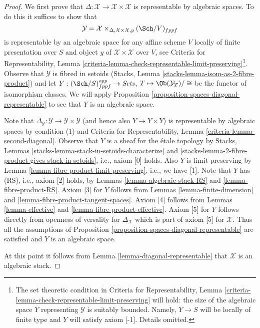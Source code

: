 \begin{proof}
We first prove that $\Delta : \mathcal{X} \to \mathcal{X} \times \mathcal{X}$
is representable by algebraic spaces. To do this it suffices to show
that
$$
\mathcal{Y} =
\mathcal{X} \times_{\Delta, \mathcal{X} \times \mathcal{X}, y} (\Sch/V)_{fppf}
$$
is representable by an algebraic space for any affine scheme $V$ locally
of finite presentation over $S$ and object $y$ of
$\mathcal{X} \times \mathcal{X}$ over $V$, see
Criteria for Representability, Lemma
\ref{criteria-lemma-check-representable-limit-preserving}\footnote{The
set theoretic condition in Criteria for Representability, Lemma
\ref{criteria-lemma-check-representable-limit-preserving}
will hold: the size of the algebraic space $Y$ representing $\mathcal{Y}$ is
suitably bounded. Namely, $Y \to S$ will be locally of finite type and $Y$
will satisfy axiom [-1]. Details omitted.}.
Observe that $\mathcal{Y}$ is fibred in setoids
(Stacks, Lemma \ref{stacks-lemma-isom-as-2-fibre-product})
and let $Y : (\Sch/S)_{fppf}^{opp} \to \textit{Sets}$,
$T \mapsto \Ob(\mathcal{Y}_T)/\cong$ be the functor of isomorphism
classes. We will apply
Proposition \ref{proposition-spaces-diagonal-representable}
to see that $Y$ is an algebraic space.

\medskip\noindent
Note that
$\Delta_\mathcal{Y} : \mathcal{Y} \to \mathcal{Y} \times \mathcal{Y}$
(and hence also $Y \to Y \times Y$)
is representable by algebraic spaces by condition (1) and
Criteria for Representability, Lemma \ref{criteria-lemma-second-diagonal}.
Observe that $Y$ is a sheaf for the \'etale topology by
Stacks, Lemmas \ref{stacks-lemma-stack-in-setoids-characterize} and
\ref{stacks-lemma-2-fibre-product-gives-stack-in-setoids}, i.e.,
axiom [0] holds. Also $Y$ is limit preserving by
Lemma \ref{lemma-fibre-product-limit-preserving}, i.e., we have [1].
Note that $Y$ has (RS), i.e., axiom [2] holds, by
Lemmas \ref{lemma-algebraic-stack-RS} and
\ref{lemma-fibre-product-RS}. Axiom [3] for $Y$ follows
from Lemmas \ref{lemma-finite-dimension} and
\ref{lemma-fibre-product-tangent-spaces}.
Axiom [4] follows from Lemmas \ref{lemma-effective} and
\ref{lemma-fibre-product-effective}.
Axiom [5] for $Y$ follows directly from openness of versality
for $\Delta_\mathcal{X}$ which is part of axiom [5] for $\mathcal{X}$.
Thus all the assumptions of
Proposition \ref{proposition-spaces-diagonal-representable}
are satisfied and $Y$ is an algebraic space.

\medskip\noindent
At this point it follows from Lemma \ref{lemma-diagonal-representable}
that $\mathcal{X}$ is an algebraic stack.
\end{proof}





